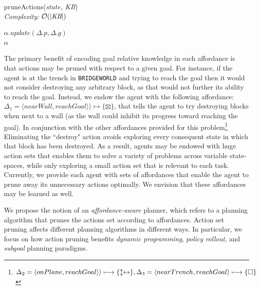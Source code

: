 \documentclass[]{article}
\begin{document}
\begin{algorithm}
  \caption{pruneActions($state$, {\it KB}) \\ {\it Complexity:} $\mathcal{O}(|\text{{\it KB}}|)$}
  \begin{algorithmic}[1]
    \State $\alpha.update(\Delta.p, \Delta.g)$
    \EndIf
    \EndFor \\
    \Return $\alpha$
  \end{algorithmic}
  \label{alg:prune_actions}
\end{algorithm}


The primary benefit of encoding goal relative knowledge in each
affordance is that actions may be pruned with respect to a given goal.
For instance, if the agent is at the trench in \texttt{BRIDGEWORLD}
and trying to reach the goal then it would not consider destroying any arbitrary
block, as that would not further its ability to reach the goal. Instead, we endow
the agent with the following affordance: $\Delta_1 = \langle nearWall, reachGoal \rangle \rangle \longmapsto \{\boxtimes\}$,
that tells the agent to try destroying blocks when next to a wall
(as the wall could inhibit its progress toward reaching the goal). In conjunction
with the other affordances provided for this problem\footnote{$\Delta_2 = \langle onPlane, reachGoal \rangle \rangle \longmapsto \{\updownarrow \leftrightarrow\}, \\ \Delta_3 = \langle nearTrench, reachGoal \rangle \longmapsto \{\square \}$}
Eliminating the ``destroy" action avoids exploring every consequent state in which that block has
been destroyed.  As a result, agents may be endowed with huge action
sets that enables them to solve a variety of problems across variable
state-spaces, while only exploring a small action set that is relevant
to each task. Currently, we provide each agent with sets of affordances
that enable the agent to prune away its unnecessary actions optimally.
We envision that these affordances may be learned as well.


We propose the notion of an {\it affordance-aware} planner, which refers to
a planning algorithm that prunes the actions set according to affordances.
Action set pruning affects different planning algorithms in
different ways. In particular, we focus on how action pruning benefits
{\em dynamic programming}, {\em policy rollout}, and {\em subgoal} planning paradigms.
\end{document}
